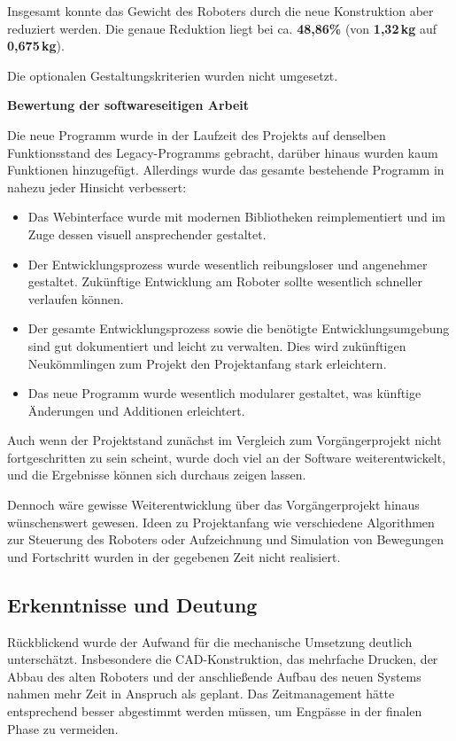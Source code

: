 Insgesamt konnte das Gewicht des Roboters durch die neue Konstruktion aber reduziert werden. Die genaue Reduktion liegt bei ca. \textbf{48{,}86\%} (von \textbf{1{,}32\,kg} auf \textbf{0{,}675\,kg}).

Die optionalen Gestaltungskriterien wurden nicht umgesetzt. 

\textbf{Bewertung der softwareseitigen Arbeit}

Die neue Programm wurde in der Laufzeit des Projekts auf denselben Funktionsstand des Legacy-Programms gebracht, darüber hinaus wurden kaum Funktionen hinzugefügt. Allerdings wurde das gesamte bestehende Programm in nahezu jeder Hinsicht verbessert:

\begin{itemize}
	\item Das Webinterface wurde mit modernen Bibliotheken reimplementiert und im Zuge dessen visuell ansprechender gestaltet.
	\item Der Entwicklungsprozess wurde wesentlich reibungsloser und angenehmer gestaltet. Zukünftige Entwicklung am Roboter sollte wesentlich schneller verlaufen können.
	\item Der gesamte Entwicklungsprozess sowie die benötigte Entwicklungsumgebung sind gut dokumentiert und leicht zu verwalten. Dies wird zukünftigen Neukömmlingen zum Projekt den Projektanfang stark erleichtern.
	\item Das neue Programm wurde wesentlich modularer gestaltet, was künftige Änderungen und Additionen erleichtert.
\end{itemize}

Auch wenn der Projektstand zunächst im Vergleich zum Vorgängerprojekt nicht fortgeschritten zu sein scheint, wurde doch viel an der Software weiterentwickelt, und die Ergebnisse können sich durchaus zeigen lassen.

Dennoch wäre gewisse Weiterentwicklung über das Vorgängerprojekt hinaus wünschenswert gewesen. Ideen zu Projektanfang wie verschiedene Algorithmen zur Steuerung des Roboters oder Aufzeichnung und Simulation von Bewegungen und Fortschritt wurden in der gegebenen Zeit nicht realisiert.

\subsection{Erkenntnisse und Deutung}

Rückblickend wurde der Aufwand für die mechanische Umsetzung deutlich unterschätzt. Insbesondere die CAD-Konstruktion, das mehrfache Drucken, der Abbau des alten Roboters und der anschließende Aufbau des neuen Systems nahmen mehr Zeit in Anspruch als geplant. Das Zeitmanagement hätte entsprechend besser abgestimmt werden müssen, um Engpässe in der finalen Phase zu vermeiden.

